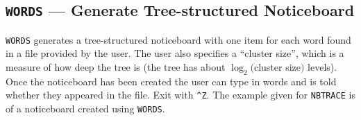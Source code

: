 \documentclass[twoside,11pt]{article}
\renewcommand{\_}{\texttt{\symbol{95}}}
\begin{document}
\subsection {{\tt WORDS} --- Generate Tree-structured Noticeboard}

{\tt WORDS} generates a tree-structured noticeboard with one item for each
word found in a file provided by the user. The user also specifies a ``cluster
size'', which is a measure of how deep the tree is (the tree has about
$\log_{2} ($cluster size$)$ levels). Once the noticeboard has been created
the user can type in words and is told whether they appeared in the file.
Exit with \verb|^Z|. The example given for {\tt NBTRACE} is of a noticeboard
created using {\tt WORDS}.
\end{document}
